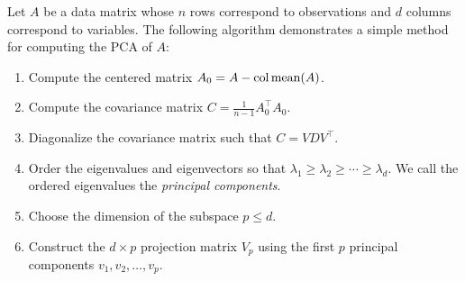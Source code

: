 Let \(A\) be a data matrix whose \(n\) rows correspond to observations and \(d\) columns correspond to variables.
The following algorithm demonstrates a simple method for computing the PCA of \(A\):
\begin{enumerate}
    \item Compute the centered matrix \(A_0 = A - \operatorname{col\,mean}(A)\).
    \item Compute the covariance matrix \(C = \frac{1}{n-1} A_0^\top A_0\).
    \item Diagonalize the covariance matrix such that \(C = V D V^\top\).
    \item Order the eigenvalues and eigenvectors so that \(\lambda_1 \geq \lambda_2 \geq \cdots \geq \lambda_d\).
    We call the ordered eigenvalues the \textit{principal components}.
    \item Choose the dimension of the subspace \(p \leq d\).
    \item Construct the \(d \times p\) projection matrix \(V_p\) using the first \(p\) principal components \(v_1, v_2, \dots, v_p\).
\end{enumerate}